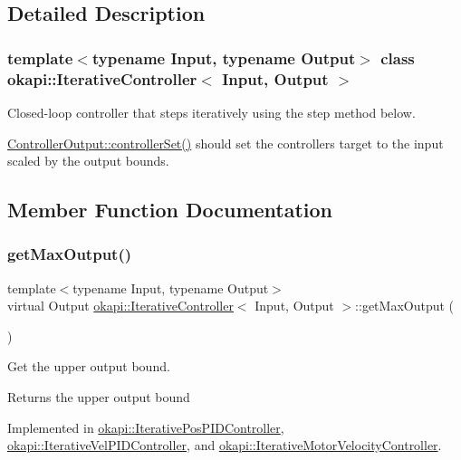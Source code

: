 \subsection{Detailed Description}
\subsubsection*{template$<$typename Input, typename Output$>$\newline
class okapi\+::\+Iterative\+Controller$<$ Input, Output $>$}

Closed-\/loop controller that steps iteratively using the step method below.

{\ttfamily \mbox{\hyperlink{classokapi_1_1ControllerOutput_a360c08f0c10b36f882d6d3100c2cad49}{Controller\+Output\+::controller\+Set()}}} should set the controller\textquotesingle{}s target to the input scaled by the output bounds. 

\subsection{Member Function Documentation}
\mbox{\label{classokapi_1_1IterativeController_a09bdba3a6d7854d943ed5401210b0595}} 
\subsubsection{\texorpdfstring{getMaxOutput()}{getMaxOutput()}}
{\footnotesize\ttfamily template$<$typename Input, typename Output$>$ \\
virtual Output \mbox{\hyperlink{classokapi_1_1IterativeController}{okapi\+::\+Iterative\+Controller}}$<$ Input, Output $>$\+::get\+Max\+Output (\begin{DoxyParamCaption}{ }\end{DoxyParamCaption})\hspace{0.3cm}{\ttfamily [pure virtual]}}

Get the upper output bound.

\begin{DoxyReturn}{Returns}
the upper output bound 
\end{DoxyReturn}


Implemented in \mbox{\hyperlink{classokapi_1_1IterativePosPIDController_a71538d55cd0a98812a749af84f8ec7aa}{okapi\+::\+Iterative\+Pos\+P\+I\+D\+Controller}}, \mbox{\hyperlink{classokapi_1_1IterativeVelPIDController_acf26277c959a7fd03c918340e194a361}{okapi\+::\+Iterative\+Vel\+P\+I\+D\+Controller}}, and \mbox{\hyperlink{classokapi_1_1IterativeMotorVelocityController_a48d88a7c9cec2c7046d0f7f61d8777c9}{okapi\+::\+Iterative\+Motor\+Velocity\+Controller}}.

